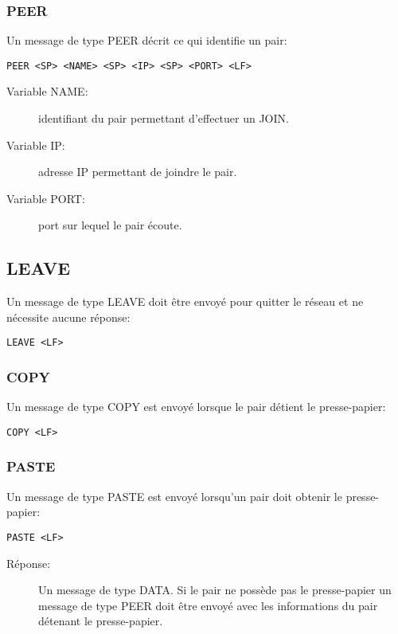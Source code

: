 \subsubsection*{PEER}
Un message de type PEER décrit ce qui identifie un pair:
\begin{verbatim}
PEER <SP> <NAME> <SP> <IP> <SP> <PORT> <LF>
\end{verbatim}
\begin{description}
\item[Variable NAME:] identifiant du pair permettant d'effectuer un JOIN.
\item[Variable IP:] adresse IP permettant de joindre le pair.
\item[Variable PORT:] port sur lequel le pair écoute.
\end{description}

\subsection*{LEAVE}
Un message de type LEAVE doit être envoyé pour quitter le réseau et ne
nécessite aucune réponse:
\begin{verbatim}
LEAVE <LF>
\end{verbatim}

\subsubsection*{COPY}
Un message de type COPY est envoyé lorsque le pair détient le presse-papier:
\begin{verbatim}
COPY <LF>
\end{verbatim}

\subsubsection*{PASTE}
Un message de type PASTE est envoyé lorsqu'un pair doit obtenir le
presse-papier:
\begin{verbatim}
PASTE <LF>
\end{verbatim}
\begin{description}
\item[Réponse:] Un message de type DATA. Si le pair ne possède pas le
  presse-papier un message de type PEER doit être envoyé avec les informations
  du pair détenant le presse-papier.
\end{description}

